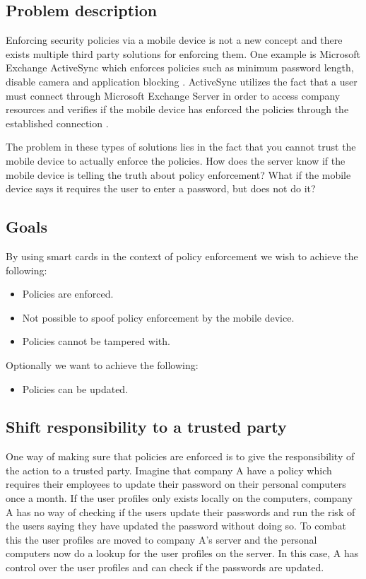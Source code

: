 \subsection{Problem description}
Enforcing security policies via a mobile device is not a new concept and there exists multiple third party solutions for enforcing them. One example is Microsoft Exchange ActiveSync which enforces policies such as minimum password length, disable camera and application blocking \cite{exchangePolicies, msExchangeCookBook}. ActiveSync utilizes the fact that a user must connect through Microsoft Exchange Server in order to access company resources and verifies if the mobile device has enforced the policies through the established connection \cite{exchangePoliciesTech}.

The problem in these types of solutions lies in the fact that you cannot trust the mobile device to actually enforce the policies. How does the server know if the mobile device is telling the truth about policy enforcement? What if the mobile device says it requires the user to enter a password, but does not do it?

\subsection{Goals}
By using smart cards in the context of policy enforcement we wish to achieve the following:
\begin{itemize}
  \item Policies are enforced.
  \item Not possible to spoof policy enforcement by the mobile device.
  \item Policies cannot be tampered with.
\end{itemize}
Optionally we want to achieve the following:
\begin{itemize}
  \item Policies can be updated.
\end{itemize}

\subsection{Shift responsibility to a trusted party}
One way of making sure that policies are enforced is to give the responsibility of the action to a trusted party. Imagine that company A have a policy which requires their employees to update their password on their personal computers once a month. If the user profiles only exists locally on the computers, company A has no way of checking if the users update their passwords and run the risk of the users saying they have updated the password without doing so. To combat this the user profiles are moved to company A's server and the personal computers now do a lookup for the user profiles on the server. In this case, A has control over the user profiles and can check if the passwords are updated.

